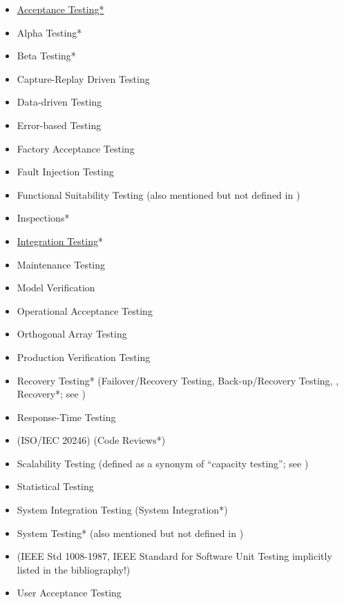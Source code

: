     \begin{itemize}
        \item \underline{Acceptance Testing*}
        \item Alpha Testing*
        \item Beta Testing*
        \item Capture-Replay Driven Testing
        \item Data-driven Testing
        \item Error-based Testing
        \item Factory Acceptance Testing
        \item Fault Injection Testing
        \item Functional Suitability Testing (also mentioned but not defined in
              \citep{IEEE2017})
        \item Inspections*
        \item \underline{Integration Testing}*
        \item Maintenance Testing
        \item Model Verification
        \item Operational Acceptance Testing
        \item Orthogonal Array Testing
        \item Production Verification Testing
        \item Recovery Testing* (Failover/Recovery Testing, Back-up/Recovery
              Testing, ,
              Recovery*; see )
        \item Response-Time Testing
        \item {} (ISO/IEC 20246) (Code Reviews*)
        \item Scalability Testing (defined as a synonym of ``capacity
              testing''; see )
        \item Statistical Testing
        \item System Integration Testing (System Integration*)
        \item System Testing* (also mentioned but not defined in \citep{IEEE2013})
        \item {}
              (IEEE Std 1008-1987, IEEE Standard for
              Software Unit Testing implicitly listed in the bibliography!)
        \item User Acceptance Testing
    \end{itemize}
\fi

